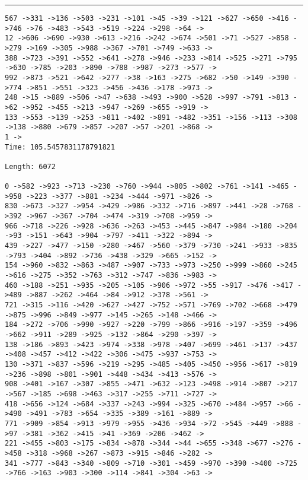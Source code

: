 \documentclass[letter, 12pt]{article}
\newenvironment{question}[1]{%
    \vspace{.2in}%
        \noindent{\bf #1}%
    \vspace{0.3em} \hrule \vspace{.1in}%
}{}
\begin{document}
\begin{question}{\large Appendix}
\begin{lstlisting}[style=CStyle]
567 ->331 ->136 ->503 ->231 ->101 ->45 ->39 ->121 ->627 ->650 ->416 ->746 ->76 ->483 ->543 ->519 ->224 ->298 ->64 ->
12 ->606 ->690 ->930 ->613 ->216 ->242 ->674 ->501 ->71 ->527 ->858 ->279 ->169 ->305 ->988 ->367 ->701 ->749 ->633 ->
388 ->723 ->391 ->552 ->641 ->278 ->946 ->233 ->814 ->525 ->271 ->795 ->630 ->785 ->203 ->890 ->788 ->987 ->273 ->577 ->
992 ->873 ->521 ->642 ->277 ->38 ->163 ->275 ->682 ->50 ->149 ->390 ->774 ->851 ->551 ->323 ->456 ->436 ->178 ->973 ->
248 ->15 ->889 ->506 ->47 ->638 ->493 ->900 ->528 ->997 ->791 ->813 ->62 ->952 ->455 ->213 ->947 ->269 ->655 ->919 ->
133 ->553 ->139 ->253 ->811 ->402 ->891 ->482 ->351 ->156 ->113 ->308 ->138 ->880 ->679 ->857 ->207 ->57 ->201 ->868 ->
1 ->
Time: 105.5457831178791821

Length: 6072

0 ->582 ->923 ->713 ->230 ->760 ->944 ->805 ->802 ->761 ->141 ->465 ->958 ->223 ->377 ->881 ->234 ->444 ->971 ->826 ->
830 ->673 ->327 ->954 ->429 ->986 ->332 ->716 ->897 ->441 ->28 ->768 ->392 ->967 ->367 ->704 ->474 ->319 ->708 ->959 ->
966 ->718 ->226 ->928 ->636 ->263 ->453 ->445 ->847 ->984 ->180 ->204 ->93 ->151 ->643 ->904 ->797 ->411 ->322 ->894 ->
439 ->227 ->477 ->150 ->280 ->467 ->560 ->379 ->730 ->241 ->933 ->835 ->793 ->404 ->892 ->736 ->438 ->329 ->665 ->152 ->
154 ->960 ->832 ->863 ->487 ->907 ->733 ->973 ->250 ->999 ->860 ->245 ->616 ->275 ->352 ->763 ->312 ->747 ->836 ->983 ->
460 ->188 ->251 ->935 ->205 ->105 ->906 ->972 ->55 ->917 ->476 ->417 ->489 ->887 ->262 ->464 ->84 ->912 ->378 ->561 ->
721 ->315 ->116 ->420 ->627 ->427 ->752 ->571 ->769 ->702 ->668 ->479 ->875 ->996 ->849 ->977 ->145 ->265 ->148 ->466 ->
184 ->272 ->706 ->990 ->927 ->220 ->799 ->866 ->916 ->197 ->359 ->496 ->662 ->911 ->289 ->925 ->132 ->864 ->290 ->397 ->
138 ->186 ->893 ->423 ->974 ->338 ->978 ->407 ->699 ->461 ->137 ->437 ->408 ->457 ->412 ->422 ->306 ->475 ->937 ->753 ->
130 ->371 ->837 ->596 ->219 ->295 ->485 ->405 ->450 ->956 ->617 ->819 ->236 ->898 ->801 ->901 ->448 ->434 ->413 ->576 ->
908 ->401 ->167 ->307 ->855 ->471 ->632 ->123 ->498 ->914 ->807 ->217 ->567 ->185 ->698 ->463 ->317 ->255 ->711 ->727 ->
418 ->656 ->124 ->684 ->337 ->243 ->994 ->325 ->670 ->484 ->957 ->66 ->490 ->491 ->783 ->654 ->335 ->389 ->161 ->889 ->
771 ->909 ->854 ->913 ->979 ->955 ->436 ->934 ->72 ->545 ->449 ->888 ->97 ->381 ->362 ->415 ->41 ->369 ->206 ->462 ->
221 ->455 ->803 ->175 ->834 ->878 ->344 ->44 ->655 ->348 ->677 ->276 ->458 ->318 ->968 ->267 ->873 ->915 ->846 ->282 ->
341 ->777 ->843 ->340 ->809 ->710 ->301 ->459 ->970 ->390 ->400 ->725 ->766 ->163 ->903 ->300 ->114 ->841 ->304 ->63 ->

\end{lstlisting}
\end{question}
\end{document}
